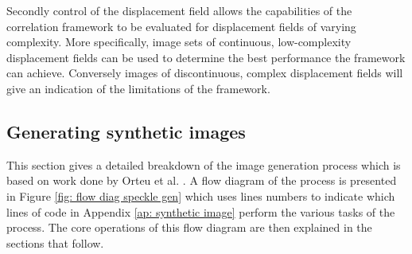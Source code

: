 \documentclass[12pt,oneside,openany,a4paper, %
english, %
masters-t, goldenblock]{usthesis}
\begin{document}
Secondly control of the displacement field allows the capabilities of the correlation framework to be evaluated for displacement fields of varying complexity. More specifically, image sets of continuous, low-complexity displacement fields can be used to determine the best performance the framework can achieve. Conversely images of discontinuous, complex displacement fields will give an indication of the limitations of the framework.










\subsection{Generating synthetic images}
This section gives a detailed breakdown of the image generation process which is based on work done by Orteu et al. \cite{orteu2006speckle}. A flow diagram of the process is presented in Figure \ref{fig: flow diag speckle gen} which uses lines numbers to indicate which lines of code in Appendix \ref{ap: synthetic image} perform the various tasks of the process. The core operations of this flow diagram are then explained in the sections that follow.
\end{document}

